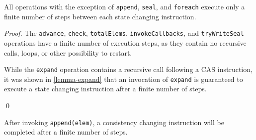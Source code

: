 \documentclass[runningheads,a4paper]{llncs}
\begin{document}
\begin{lemma}\label{lemma-finite-steps-state-change}
All operations with the exception of \verb=append=, \verb=seal=, and
\verb=foreach= execute only a finite number of steps between each state
changing instruction.
\end{lemma}

\begin{proof} The \verb=advance=, \verb=check=, \verb=totalElems=,
\verb=invokeCallbacks=, and \verb=tryWriteSeal= operations have a finite
number of execution steps, as they contain no recursive calls, loops, or other
possibility to restart.

While the \verb=expand= operation contains a recursive call following a CAS
instruction, it was shown in \ref{lemma-expand} that an invocation of
\verb=expand= is guaranteed to execute a state changing instruction after a
finite number of steps.

\qed
\end{proof}


\begin{lemma}[Append]\label{lemma-append}
After invoking \verb=append(elem)=, a consistency changing instruction will be
completed after a finite number of steps.
\end{lemma}
\end{document}
